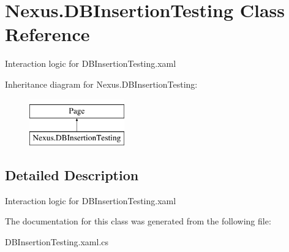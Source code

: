 \hypertarget{class_nexus_1_1_d_b_insertion_testing}{}\section{Nexus.\+D\+B\+Insertion\+Testing Class Reference}
\label{class_nexus_1_1_d_b_insertion_testing}


Interaction logic for D\+B\+Insertion\+Testing.\+xaml  


Inheritance diagram for Nexus.\+D\+B\+Insertion\+Testing\+:\begin{figure}[H]
\begin{center}
\leavevmode
\includegraphics[height=2.000000cm]{class_nexus_1_1_d_b_insertion_testing}
\end{center}
\end{figure}


\subsection{Detailed Description}
Interaction logic for D\+B\+Insertion\+Testing.\+xaml 



The documentation for this class was generated from the following file\+:\begin{DoxyCompactItemize}
\item 
D\+B\+Insertion\+Testing.\+xaml.\+cs\end{DoxyCompactItemize}
